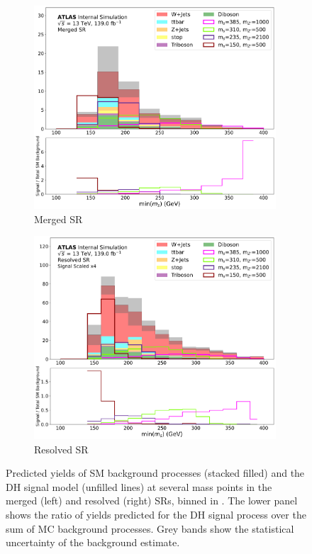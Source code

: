 \begin{figure}[htbp]
  \centering
    \begin{subfigure}[t]{0.48\textwidth}
    \centering
     \includegraphics[width = 0.99\textwidth]{Figures/7/SR1L_Merged/TARJets10_minmS_mgd.pdf}
    \caption{Merged SR}
    \end{subfigure}
    \begin{subfigure}[t]{0.48\textwidth}
    \centering
     \includegraphics[width = 0.99\textwidth]{Figures/7/SR1L_Resolved/TARJets10_minmS_res.pdf}
     \caption{Resolved SR}
    \end{subfigure}
    \caption[Predicted yields of SM background processes and the Dark Higgs signal model at several mass points in the signal regions, binned in \minms.]{Predicted yields of SM background processes (stacked filled) and the DH signal model (unfilled lines) at several mass points in the merged (left) and resolved (right) SRs, binned in \minms. The lower panel shows the ratio of yields predicted for the DH signal process over the sum of MC background processes. Grey bands show the statistical uncertainty of the background estimate.}
   \label{fig:minms_shape_discrimination}
\end{figure}


